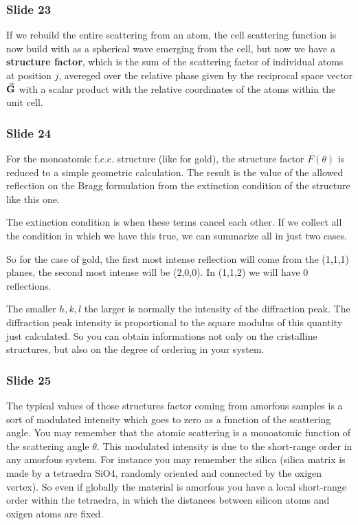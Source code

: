 \documentclass[../main/main.tex]{subfiles}
\begin{document}
\subsubsection{Slide 23}
If we rebuild the entire scattering from an atom, the cell scattering function is now build with as a spherical wave emerging from the cell, but now we have a \textbf{structure factor}, which is the sum of the scattering factor of individual atoms at position \( j \), avereged over the relative phase given by the reciprocal space vector \( \va{G} \) with a scalar product with the relative coordinates of the atoms within the unit cell.


 \subsubsection{Slide 24}
For the monoatomic f.c.c. structure (like for gold), the structure factor \( F(\theta ) \) is reduced to a simple geometric calculation.
The result is the value of the allowed reflection on the Bragg formulation from the extinction condition of the structure like this one.

The extinction condition is when these terms cancel each other. If we collect all the condition in which we have this true, we can summarize all in just two cases.

So for the case of gold, the first most intense reflection will come from the (1,1,1) planes, the second most intense will be (2,0,0). In (1,1,2) we will have 0 reflections.

The smaller \( h,k,l \) the larger is normally the intensity of the diffraction peak. The diffraction peak intensity is proportional to the square modulus of this quantity just calculated. So you can obtain informations not only on the cristalline structures, but also on the degree of ordering in your system.


\subsubsection{Slide 25}
The typical values of those structures factor coming from amorfous samples is a sort of modulated intensity which goes to zero as a function of the scattering angle. You may remember that the atomic scattering is a monoatomic function of the scattering angle \( \theta  \). This modulated intensity is due to the short-range order in any amorfous system. For instance you may remember the silica (silica matrix is made by a tetraedra SiO4, randomly oriented and connected by the oxigen vertex). So even if globally the material is amorfous you have a local short-range order within the tetraedra, in which the distances between silicon atoms and oxigen atoms are fixed.
\end{document}

